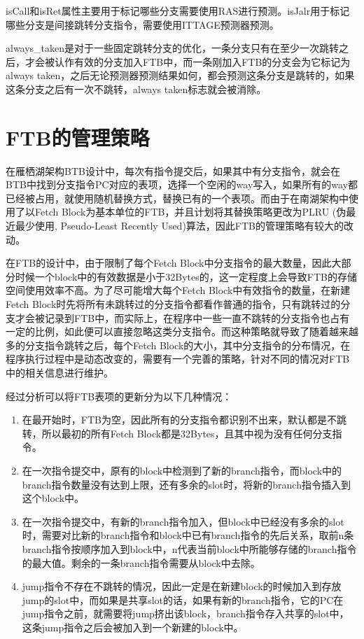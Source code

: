 isCall和isRet属性主要用于标记哪些分支需要使用RAS进行预测。isJalr用于标记哪些分支是间接跳转分支指令，需要使用ITTAGE预测器预测。

always\_taken是对于一些固定跳转分支的优化，一条分支只有在至少一次跳转之后，才会被认作有效的分支加入FTB中，而一条刚加入FTB的分支会为它标记为always taken，之后无论预测器预测结果如何，都会预测这条分支是跳转的，如果这条分支之后有一次不跳转，always taken标志就会被消除。

\section{FTB的管理策略}

在雁栖湖架构BTB设计中，每次有指令提交后，如果其中有分支指令，就会在BTB中找到分支指令PC对应的表项，选择一个空闲的way写入，如果所有的way都已经被占用，就使用随机替换方式，替换已有的一个表项。而由于在南湖架构中使用了以Fetch Block为基本单位的FTB，并且计划将其替换策略更改为PLRU (伪最近最少使用, Pseudo-Least Recently Used)算法，因此FTB的管理策略有较大的改动。

在FTB的设计中，由于限制了每个Fetch Block中分支指令的最大数量，因此大部分时候一个block中的有效数据是小于32Bytes的，这一定程度上会导致FTB的存储空间使用效率不高。为了尽可能增大每个Fetch Block中有效指令的数量，在新建Fetch Block时先将所有未跳转过的分支指令都看作普通的指令，只有跳转过的分支才会被记录到FTB中，而实际上，在程序中一些一直不跳转的分支指令也占有一定的比例，如此便可以直接忽略这类分支指令。而这种策略就导致了随着越来越多的分支指令跳转之后，每个Fetch Block的大小，其中分支指令的分布情况，在程序执行过程中是动态改变的，需要有一个完善的策略，针对不同的情况对FTB中的相关信息进行维护。

经过分析可以将FTB表项的更新分为以下几种情况：

\begin{enumerate}
	\item 在最开始时，FTB为空，因此所有的分支指令都识别不出来，默认都是不跳转，所以最初的所有Fetch Block都是32Bytes，且其中视为没有任何分支指令。
	\item 在一次指令提交中，原有的block中检测到了新的branch指令，而block中的branch指令数量没有达到上限，还有多余的slot时，将新的branch指令插入到这个block中。
	\item 在一次指令提交中，有新的branch指令加入，但block中已经没有多余的slot时，需要对比新的branch指令和block中已有branch指令的先后关系，取前n条branch指令按顺序加入到block中，n代表当前block中所能够存储的branch指令的最大值。剩余的一条branch指令需要从block中去除。
	\item jump指令不存在不跳转的情况，因此一定是在新建block的时候加入到存放jump的slot中，而如果是共享slot的话，如果有新的branch指令，它的PC在jump指令之前，就需要将jump挤出该block，branch指令存入共享的slot中，这条jump指令之后会被加入到一个新建的block中。
\end{enumerate}

